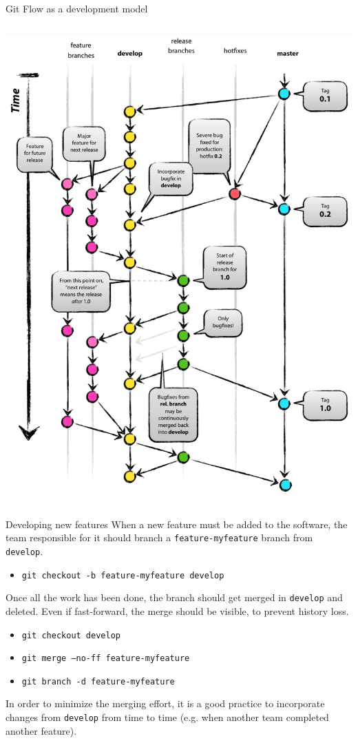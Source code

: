 \documentclass[presentation]{beamer}
\begin{document}
\begin{frame}[fragile]{Git Flow as a development model}
\begin{columns}
\begin{column}{.47\textwidth}
\begin{center}
				\includegraphics[width=\textwidth]{images/gitflow}
			\end{center}
		\end{column}
	\end{columns}
\end{frame}

\begin{frame}[fragile]{Developing new features}
	When a new feature must be added to the software, the team responsible for it should branch a \texttt{feature-myfeature} branch from \texttt{develop}.
	\begin{itemize}
		\item \texttt{git checkout -b feature-myfeature develop}
	\end{itemize}
	Once all the work has been done, the branch should get merged in \texttt{develop} and deleted. Even if fast-forward, the merge should be visible, to prevent history loss.
	\begin{itemize}
		\item \texttt{git checkout develop}
		\item \texttt{git merge --no-ff feature-myfeature}
		\item \texttt{git branch -d feature-myfeature}
	\end{itemize}
	In order to minimize the merging effort, it is a good practice to incorporate changes from \texttt{develop} from time to time (e.g. when another team completed another feature).
\end{frame}
\end{document}
